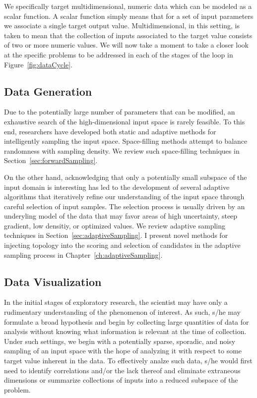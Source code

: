We specifically target multidimensional, numeric data which can be modeled as a scalar function.
%
A scalar function simply means that for a set of input parameters we associate a single target output value.
%
Multidimensional, in this setting, is taken to mean that the collection of inputs associated to the target value consists of two or more numeric values.
%
We will now take a moment to take a closer look at the specific problems to be addressed in each of the stages of the loop in Figure~\ref{fig:dataCycle}.

\subsection{Data Generation}

Due to the potentially large number of parameters that can be modified, an exhaustive search of the high-dimensional input space is rarely feasible.
%
To this end, researchers have developed both static and adaptive methods for intelligently sampling the input space.
%
Space-filling methods attempt to balance randomness with sampling density.
%
We review such space-filling techniques in Section~\ref{sec:forwardSampling}.

On the other hand, acknowledging that only a potentially small subspace of the input domain is interesting has led to the development of several adaptive algorithms that iteratively refine our understanding of the input space through careful selection of input samples.
%
The selection process is usually driven by an underyling model of the data that may favor areas of high uncertainty, steep gradient, low densitiy, or optimized values.
%
We review adaptive sampling techniques in Section~\ref{sec:adaptiveSampling}.
%
I present novel methods for injecting topology into the scoring and selection of candidates in the adaptive sampling process in Chapter~\ref{ch:adaptiveSampling}.

\subsection{Data Visualization}

In the initial stages of exploratory research, the scientist may have only a rudimentary understanding of the phenomenon of interest.
%
As such, s/he may formulate a broad hypothesis and begin by collecting large quantities of data for analysis without knowing what information is relevant at the time of collection.
%
Under such settings, we begin with a potentially sparse, sporadic, and noisy sampling of an input space with the hope of analyzing it with respect to some target value inherent in the data.
%
To effectively analze such data, s/he would first need to identify correlations and/or the lack thereof and eliminate extraneous dimensions or summarize collections of inputs into a reduced subspace of the problem.

